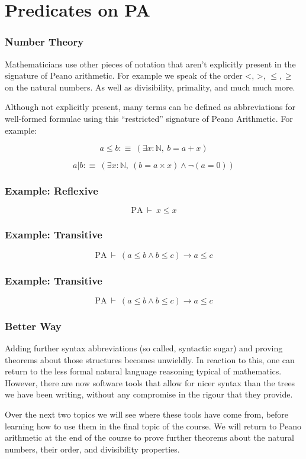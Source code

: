 \documentclass{beamer}
\theoremstyle{indentDefn} \newtheorem{defn}[]{Definition}
\begin{document}
\section{Predicates on PA}

\begin{frame}
	\frametitle{Number Theory}

	Mathematicians use other pieces of notation that aren't explicitly present in the signature of Peano arithmetic. For example we speak of the order <, >, $\leq, \geq$ on the natural numbers. As well as divisibility, primality, and much much more. 

	Although not explicitly present, many terms can be defined as abbreviations for well-formed formulae using this ``restricted'' signature of Peano Arithmetic. For example: 

	$$ a \leq b :\equiv \ (\exists x : \mathbb{N}, \ b = a + x)$$

	$$ a | b :\equiv \ (\exists x : \mathbb{N}, \ (b = a \times x) \land \lnot(a = 0))$$
\end{frame}

\begin{frame}
	\frametitle{Example: Reflexive}

	$$\text{PA} \ \vdash \ x \leq x$$

	\vspace{6cm}

\end{frame}

\begin{frame}
	\frametitle{Example: Transitive}

	$$\text{PA} \ \vdash \ (a \leq b \land b \leq c) \to a \leq c$$

	\vspace{6cm}

\end{frame}

\begin{frame}
	\frametitle{Example: Transitive}

	$$\text{PA} \ \vdash \ (a \leq b \land b \leq c) \to a \leq c$$

	\vspace{6cm}

\end{frame}

\begin{frame}
	\frametitle{Better Way}

	Adding further syntax abbreviations (so called, syntactic sugar) and proving theorems about those structures becomes unwieldly. In reaction to this, one can return to the less formal natural language reasoning typical of mathematics. However, there are now software tools that allow for nicer syntax than the trees we have been writing, without any compromise in the rigour that they provide. 

	Over the next two topics we will see where these tools have come from, before learning how to use them in the final topic of the course. We will return to Peano arithmetic at the end of the course to prove further theorems about the natural numbers, their order, and divisibility properties. 

\end{frame}
\end{document}
